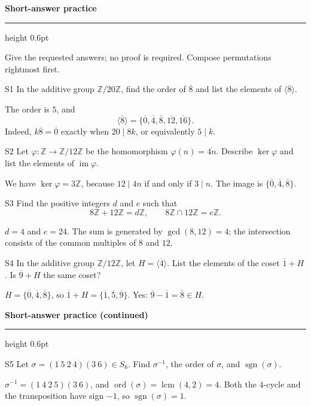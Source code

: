 \documentclass[11pt]{article}
\newcommand{\chapterheading}[1]{%
  \par\vspace{0.5em}
  {\color{courseblue}\Large\bfseries #1}\par\vspace{0.35em}
  {\color{boxborder}\hrule height 0.6pt}\vspace{0.35em}
}
\begin{document}
\newpage
\chapterheading{Short-answer practice}
Give the requested answers; no proof is required. Compose permutations rightmost first.
\begin{exercise}{S1}
In the additive group $\mathbb Z/20\mathbb Z$, find the order of
$\overline{8}$ and list the elements of $\langle\overline{8}\rangle$.
\end{exercise}
\begin{solution}
The order is $5$, and
\[
\langle\overline{8}\rangle
=\{\overline{0},\overline{4},\overline{8},\overline{12},\overline{16}\}.
\]
Indeed, $k\overline{8}=\overline{0}$ exactly when $20\mid8k$, or equivalently $5\mid k$.
\end{solution}
\begin{exercise}{S2}
Let $\varphi:\mathbb Z\to\mathbb Z/12\mathbb Z$ be the homomorphism
$\varphi(n)=\overline{4n}$. Describe $\ker\varphi$ and list the elements
of $\operatorname{im}\varphi$.
\end{exercise}
\begin{solution}
We have $\ker\varphi=3\mathbb Z$, because $12\mid4n$ if and only if
$3\mid n$. The image is $\{\overline{0},\overline{4},\overline{8}\}$.
\end{solution}
\begin{exercise}{S3}
Find the positive integers $d$ and $e$ such that
\[
8\mathbb Z+12\mathbb Z=d\mathbb Z,
\qquad 8\mathbb Z\cap12\mathbb Z=e\mathbb Z.
\]
\end{exercise}
\begin{solution}
$d=4$ and $e=24$. The sum is generated by $\gcd(8,12)=4$;
the intersection consists of the common multiples of $8$ and $12$.
\end{solution}
\begin{exercise}{S4}
In the additive group $\mathbb Z/12\mathbb Z$, let
$H=\langle\overline{4}\rangle$. List the elements of the coset
$\overline{1}+H$. Is $\overline{9}+H$ the same coset?
\end{exercise}
\begin{solution}
$H=\{\overline{0},\overline{4},\overline{8}\}$, so
$\overline{1}+H=\{\overline{1},\overline{5},\overline{9}\}$.
Yes: $\overline{9}-\overline{1}=\overline{8}\in H$.
\end{solution}
\newpage
\chapterheading{Short-answer practice (continued)}
\begin{exercise}{S5}
Let $\sigma=(1\ 5\ 2\ 4)(3\ 6)\in S_6$.
Find $\sigma^{-1}$, the order of $\sigma$, and $\operatorname{sgn}(\sigma)$.
\end{exercise}
\begin{solution}
$\sigma^{-1}=(1\ 4\ 2\ 5)(3\ 6)$, and
$\operatorname{ord}(\sigma)=\operatorname{lcm}(4,2)=4$.
Both the $4$-cycle and the transposition have sign $-1$, so
$\operatorname{sgn}(\sigma)=1$.
\end{solution}
\end{document}

